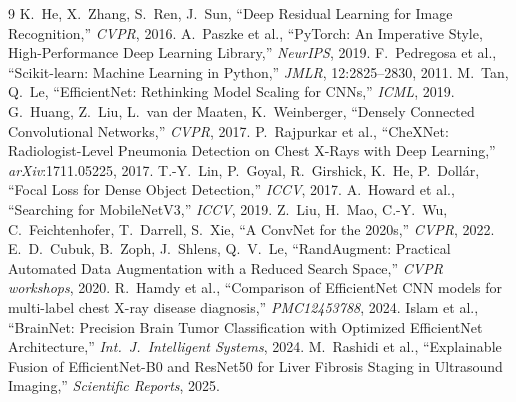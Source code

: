 \documentclass[11pt, letterpaper]{article}
\begin{document}
\newpage
\begin{thebibliography}{9}
  K.\ He, X.\ Zhang, S.\ Ren, J.\ Sun,
  ``Deep Residual Learning for Image Recognition,''
  \textit{CVPR}, 2016.
  A.\ Paszke et al., ``PyTorch: An Imperative Style, High-Performance
  Deep Learning Library,'' \textit{NeurIPS}, 2019.
  F.\ Pedregosa et al., ``Scikit-learn: Machine Learning in Python,''
  \textit{JMLR}, 12:2825--2830, 2011.
  M.\ Tan, Q.\ Le, ``EfficientNet: Rethinking Model Scaling for CNNs,''
  \textit{ICML}, 2019.
  G.\ Huang, Z.\ Liu, L.\ van der Maaten, K.\ Weinberger,
  ``Densely Connected Convolutional Networks,''
  \textit{CVPR}, 2017.
  P.\ Rajpurkar et al.,
  ``CheXNet: Radiologist-Level Pneumonia Detection on Chest X-Rays
   with Deep Learning,''
  \textit{arXiv}:1711.05225, 2017.
  T.-Y.\ Lin, P.\ Goyal, R.\ Girshick, K.\ He, P.\ Doll\'{a}r,
  ``Focal Loss for Dense Object Detection,''
  \textit{ICCV}, 2017.
  A.\ Howard et al.,
  ``Searching for MobileNetV3,''
  \textit{ICCV}, 2019.
  Z.\ Liu, H.\ Mao, C.-Y.\ Wu, C.\ Feichtenhofer, T.\ Darrell, S.\ Xie,
  ``A ConvNet for the 2020s,''
  \textit{CVPR}, 2022.
  E.\ D.\ Cubuk, B.\ Zoph, J.\ Shlens, Q.\ V.\ Le,
  ``RandAugment: Practical Automated Data Augmentation with a Reduced
   Search Space,''
  \textit{CVPR workshops}, 2020.
  R.\ Hamdy et al.,
  ``Comparison of EfficientNet CNN models for multi-label chest X-ray
   disease diagnosis,''
  \textit{PMC12453788}, 2024.
  Islam et al.,
  ``BrainNet: Precision Brain Tumor Classification with Optimized
   EfficientNet Architecture,''
  \textit{Int.\ J.\ Intelligent Systems}, 2024.
  M.\ Rashidi et al.,
  ``Explainable Fusion of EfficientNet-B0 and ResNet50 for Liver Fibrosis
   Staging in Ultrasound Imaging,''
  \textit{Scientific Reports}, 2025.
\end{thebibliography}
\end{document}
